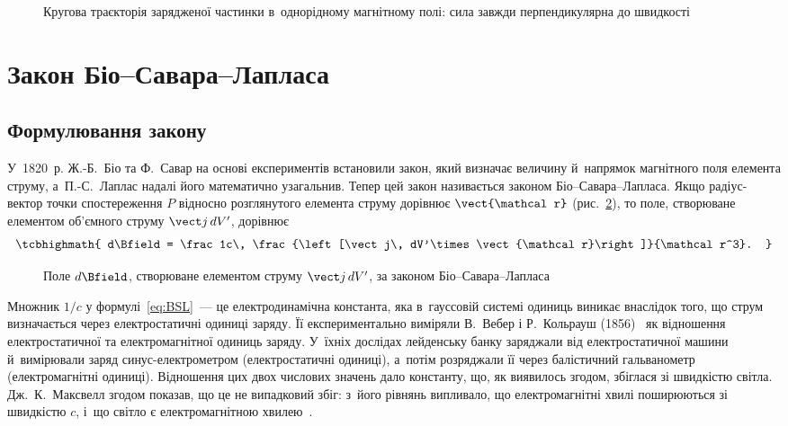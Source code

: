 \begin{figure}\centering
	\caption{Кругова траєкторія зарядженої частинки в~однорідному магнітному полі: сила
		завжди перпендикулярна до швидкості\label{pic:CyclotronicTrajectory}}
\end{figure}


\section{Закон Біо--Савара--Лапласа}\hypertarget{biot-savart-law}{}


\subsection*{Формулювання закону}


У~1820~р. Ж.-Б.~Біо та Ф.~Савар на основі експериментів встановили закон, який визначає
величину й~напрямок магнітного поля елемента струму, а~П.-С.~Лаплас надалі його
математично узагальнив. Тепер цей закон називається законом Біо--Савара--Лапласа. Якщо
радіус-вектор точки спостереження $P$ відносно розглянутого елемента струму дорівнює
$\vect{\mathcal r}$ (рис.~\ref{pic:BSL}), то поле, створюване елементом об'ємного струму
$\vect j\, dV'$, дорівнює
\begin{equation}\label{eq:BSL}
	\tcbhighmath{
		d\Bfield = \frac1c\, \frac{\left[\vect j\, dV'\times\vect{\mathcal r}\right]}{\mathcal r^3}.
	}
\end{equation}

\begin{figure}\centering
	\caption{Поле $d\Bfield$, створюване елементом струму $\vect j\, dV'$, за законом
		Біо--Савара--Лапласа\label{pic:BSL}}
\end{figure}

\begin{Historical}[unbreakable]
	Множник $1/c$ у формулі~\eqref{eq:BSL}~--- це електродинамічна константа, яка
	в~гауссовій системі одиниць виникає внаслідок того, що струм визначається через
	електростатичні одиниці заряду. Її експериментально виміряли В.~Вебер і Р.~Кольрауш
	(1856)~\cite{WeberKohlrausch1856} як відношення електростатичної та електромагнітної одиниць заряду. У~їхніх
	дослідах лейденську банку заряджали від електростатичної машини й~вимірювали заряд
	синус-електрометром (електростатичні одиниці), а~потім розряджали її через балістичний
	гальванометр (електромагнітні одиниці). Відношення цих двох числових значень дало
	константу, що, як виявилось згодом, збіглася зі швидкістю світла. Дж.~К.~Максвелл
	згодом показав, що це не випадковий збіг: з~його рівнянь випливало, що електромагнітні
	хвилі поширюються зі швидкістю $c$, і~що світло є електромагнітною хвилею~\cite{Maxwell1865}.
\end{Historical}

